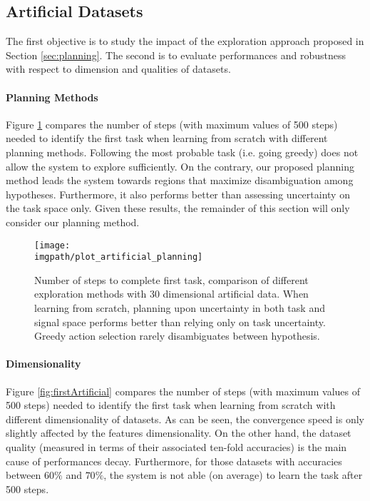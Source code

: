 \subsection{Artificial Datasets}
The first objective is to study the impact of the exploration approach proposed in Section \ref{sec:planning}. The second is to evaluate performances and robustness with respect to dimension and qualities of datasets. 

\paragraph{Planning Methods}
Figure \ref{fig:planning} compares the number of steps (with maximum values of 500 steps) needed to identify the first task when learning from scratch with different planning methods. Following the most probable task (i.e. going greedy) does not allow the system to explore sufficiently. On the contrary, our proposed planning method leads the system towards regions that maximize disambiguation among hypotheses. Furthermore, it also performs better than assessing uncertainty on the task space only. Given these results, the remainder of this section will only consider our planning method.

\begin{figure}[!ht]
  \centering
      \texttt{[image: \\imgpath/plot\_artificial\_planning]}
      \caption{Number of steps to complete first task, comparison of different exploration methods with 30 dimensional artificial data. When learning from scratch, planning upon uncertainty in both task and signal space performs better than relying only on task uncertainty. Greedy action selection rarely disambiguates between hypothesis.}
    \label{fig:planning}
\end{figure}


\paragraph{Dimensionality}

Figure \ref{fig:firstArtificial} compares the number of steps (with maximum values of 500 steps) needed to identify the first task when learning from scratch with different dimensionality of datasets. As can be seen, the convergence speed is only slightly affected by the features dimensionality. On the other hand, the dataset quality (measured in terms of their associated ten-fold accuracies) is the main cause of performances decay. Furthermore, for those datasets with accuracies between $60\%$ and $70\%$, the system is not able (on average) to learn the task after 500 steps.

